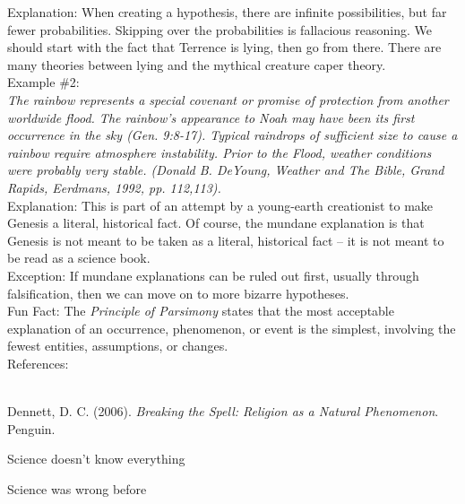 \documentclass[a4paper,12pt,single,pdftex]{scrartcl}
\begin{document}
    
      Explanation: When creating a hypothesis, there are infinite possibilities, but far fewer probabilities.  Skipping over the probabilities is fallacious reasoning.  We should start with the fact that Terrence is lying, then go from there.  There are many theories between lying and the mythical creature caper theory.
    \\

    
      Example \#2:
    \\

    
      {\em The rainbow represents a special covenant or promise of protection from another worldwide flood. The rainbow's appearance to Noah may have been its first occurrence in the sky (Gen. 9:8-17). Typical raindrops of sufficient size to cause a rainbow require atmosphere instability. Prior to the Flood, weather conditions were probably very stable. (Donald B. DeYoung, Weather and The Bible, Grand Rapids, Eerdmans, 1992, pp. 112,113).}
    \\

    
      Explanation: This is part of an attempt by a young-earth creationist to make Genesis a literal, historical fact.  Of course, the mundane explanation is that Genesis is not meant to be taken as a literal, historical fact -- it is not meant to be read as a science book.
    \\

    
      Exception: If mundane explanations can be ruled out first, usually through falsification, then we can move on to more bizarre hypotheses.
    \\

    
      Fun Fact: The {\em Principle of Parsimony} states that the most acceptable explanation of an occurrence, phenomenon, or event is the simplest, involving the fewest entities, assumptions, or changes.
    \\

    References:

    
      
        
      \\

      
        
          Dennett, D. C. (2006). {\it Breaking the Spell: Religion as a Natural Phenomenon}. Penguin.
        
      
    
  

Science doesn't know everything

Science was wrong before
\end{document}

